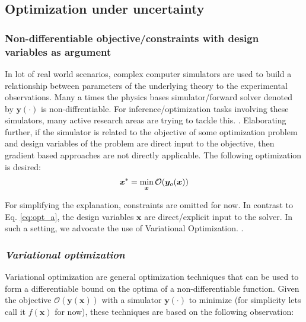 \begin{itemize}
\clearpage

\subsection{Optimization under uncertainty}






\subsubsection{Non-differentiable objective/constraints with design variables as argument}
%
In lot of real world scenarios, complex computer simulators are used to build a relationship between parameters of the underlying theory to the experimental observations. Many a times the physics bases simulator/forward solver denoted by $\bm{y}(\cdot)$ is non-diffrentiable. For inference/optimization tasks involving these simulators, many active research areas are trying to tackle this. \cite{cranmer2020frontier, louppe_adversarial_2019, beaumont2002approximate,marjoram2003markov}. Elaborating further, if the simulator is related to the objective of some optimization problem and design variables of the problem are direct input to the objective, then gradient based approaches are not directly applicable. The following optimization is desired:
\begin{align}
	\bm{x}^* = \min_{\bm{x}}\mathcal{O}(\boldsymbol{y}_o(\bm{x}))
\end{align}

For simplifying the explanation, constraints are omitted for now. In contrast to Eq. \ref{eq:opt_a}, the design variables $\bm{x}$ are direct/explicit input to the solver. In such a setting, we advocate the use of Variational Optimization. \cite{bird_stochastic_2018,staines_variational_2012,staines2013optimization}. 

\subsubsection{\emph{Variational optimization}}

Variational optimization are general optimization techniques that can be used to form a differentiable bound on the optima of a non-differentiable function. Given the objective $\mathcal{O}(\bm{y}(\bm{x}))$ with a simulator $\bm{y}(\cdot)$ to minimize (for simplicity lets call it $f(\bm{x})$ for now), these techniques are based on the following observation:


\end{itemize}
